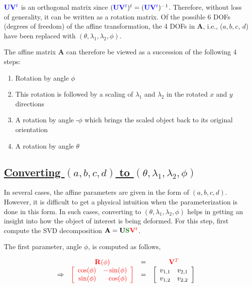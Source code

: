 ${\color{blue}\mathbf{U}\mathbf{V}^t}$ is an orthogonal matrix since $({\color{blue}\mathbf{U}\mathbf{V}^t})^t =({\color{blue}\mathbf{U}\mathbf{V}^t})^{-1}$.  Therefore, without loss of generality, it can be written as a rotation matrix.  Of the possible 6 DOFs (degrees of freedom) of the affine transformation, the 4 DOFs in $\mathbf{A}$, i.e., ($a, b, c$, $d$) have been replaced with $(\theta, \lambda_1, \lambda_2, \phi)$.

The affine matrix $\mathbf{A}$ can therefore be viewed as a succession of the following 4 steps:

\begin{enumerate} 
\item Rotation by angle $\phi$ 
\item This rotation is followed by a scaling of $\lambda_1$ and $\lambda_2$ in the rotated $x$ and $y$ directions
\item A rotation by angle -$\phi$ which brings the scaled object back to its original orientation
\item A rotation by angle $\theta$
\end{enumerate}

\subsection{\underline{Converting $(a, b, c, d)$ to $(\theta, \lambda_1, \lambda_2, \phi)$}}
In several cases, the affine parameters are given in the form of $(a, b, c, d)$.  However, it is difficult to get a physical intuition when the parameterization is done in this form.  In such cases, converting to $(\theta, \lambda_1, \lambda_2, \phi)$ helps in getting an insight into how the object of interest is being deformed.  For this step, first compute the SVD decomposition $\mathbf{A}=\mathbf{U}{\color{darkgreen}\mathbf{S}}{\color{red}\mathbf{V}^t}$.  

The first parameter, angle $\phi$, is computed as follows,

\begin{equation}
\begin{array}{ccccll}
&{\color{red}\mathbf{R}(\phi)}&=&{\color{red}\mathbf{V}^T}\\
\Rightarrow &{\color{red}\left[ \begin{array}{rr} \cos(\phi) & -\sin(\phi) \\ \sin(\phi) & \cos(\phi) \\ \end{array} \right]} &=& \left[\begin{array}{llll}v_{1,1} &v_{2,1}\\v_{1,2} & v_{2,2}\end{array}\right]\\
\end{array}
\end{equation}

